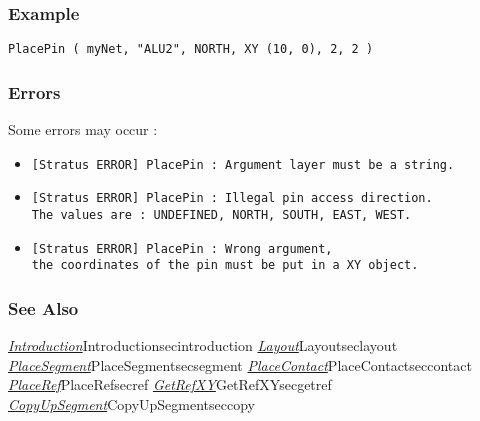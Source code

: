 \subsubsection{Example}

\begin{verbatim}
PlacePin ( myNet, "ALU2", NORTH, XY (10, 0), 2, 2 )
\end{verbatim}

\subsubsection{Errors}
    
Some errors may occur :
\begin{itemize}
    \item \verb-[Stratus ERROR] PlacePin : Argument layer must be a string.-
    \item \verb-[Stratus ERROR] PlacePin : Illegal pin access direction.-\\\verb-The values are : UNDEFINED, NORTH, SOUTH, EAST, WEST.-
    \item \verb-[Stratus ERROR] PlacePin : Wrong argument,-\\\verb-the coordinates of the pin must be put in a XY object.-
\end{itemize}

\begin{htmlonly}
        
\subsubsection{See Also}

\hyperref[ref]{\emph{Introduction}}{}{Introduction}{secintroduction}
\hyperref[ref]{\emph{Layout}}{}{Layout}{seclayout}
\hyperref[ref]{\emph{PlaceSegment}}{}{PlaceSegment}{secsegment}
\hyperref[ref]{\emph{PlaceContact}}{}{PlaceContact}{seccontact}
\hyperref[ref]{\emph{PlaceRef}}{}{PlaceRef}{secref}
\hyperref[ref]{\emph{GetRefXY}}{}{GetRefXY}{secgetref}
\hyperref[ref]{\emph{CopyUpSegment}}{}{CopyUpSegment}{seccopy}

\end{htmlonly}
